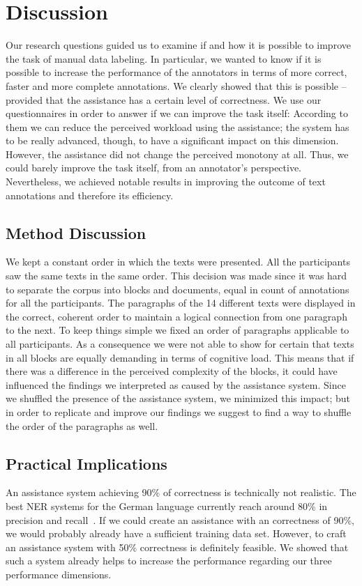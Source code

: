 \section{Discussion}
	Our research questions guided us to examine if and how it is possible to improve the task of manual data labeling. In particular, we wanted to know if it is possible to increase the performance of the annotators in terms of more correct, faster and more complete annotations. We clearly showed that this is possible -- provided that the assistance has a certain level of correctness. We use our questionnaires in order to answer if we can improve the task itself: According to them we can reduce the perceived workload using the assistance; the system has to be really advanced, though, to have a significant impact on this dimension. However, the assistance did not change the perceived monotony at all. Thus, we could barely improve the task itself, from an annotator's perspective. Nevertheless, we achieved notable results in improving the outcome of text annotations and therefore its efficiency.

	

	\subsection{Method Discussion}
		We kept a constant order in which the texts were presented. All the participants saw the same texts in the same order. This decision was made since it was hard to separate the corpus into blocks and documents, equal in count of annotations for all the participants. The paragraphs of the 14 different texts were displayed in the correct, coherent order to maintain a logical connection from one paragraph to the next. To keep things simple we fixed an order of paragraphs applicable to all participants. As a consequence we were not able to show for certain that texts in all blocks are equally demanding in terms of cognitive load. This means that if there was a difference in the perceived complexity of the blocks, it could have influenced the findings we interpreted as caused by the assistance system. Since we shuffled the presence of the assistance system, we minimized this impact; but in order to replicate and improve our findings we suggest to find a way to shuffle the order of the paragraphs as well.

	\subsection{Practical Implications}
		\label{sec:discussionImplications}
		An assistance system achieving 90\% of correctness is technically not realistic. The best \ac{NER} systems for the German language currently reach around 80\% in precision and recall~\cite{benikova2014germeval}. If we could create an assistance with an correctness of 90\%, we would probably already have a sufficient training data set. However, to craft an assistance system with 50\% correctness is definitely feasible. We showed that such a system already helps to increase the performance regarding our three performance dimensions.

